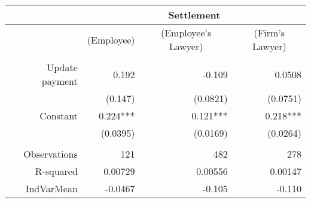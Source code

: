 \begin{tabular}{rrrr}
\toprule
      & \multicolumn{3}{c}{Settlement} \\
\midrule
      & \multicolumn{1}{c}{(Employee)} & \multicolumn{1}{c}{(Employee's Lawyer)} & \multicolumn{1}{c}{(Firm's Lawyer)} \\
      & \multicolumn{1}{c}{} & \multicolumn{1}{c}{} & \multicolumn{1}{c}{} \\
Update payment & 0.192 & -0.109 & 0.0508 \\
      & (0.147) & (0.0821) & (0.0751) \\
Constant  & 0.224*** & 0.121*** & 0.218*** \\
      & (0.0395) & (0.0169) & (0.0264) \\
      &       &       &  \\
Observations & 121   & 482   & 278 \\
R-squared & 0.00729 & 0.00556 & 0.00147 \\
IndVarMean & -0.0467 & -0.105 & -0.110 \\
\bottomrule
\end{tabular}%
